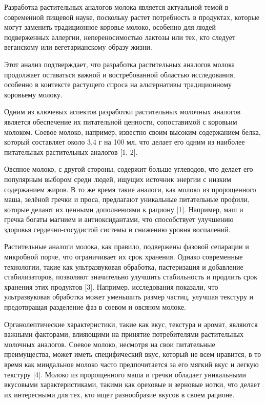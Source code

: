Разработка растительных аналогов молока является актуальной темой в
современной пищевой науке, поскольку растет потребность в продуктах,
которые могут заменить традиционное коровье молоко, особенно для людей
подверженных аллергии, непереносимостью лактозы или тех, кто следует
веганскому или вегетарианскому образу жизни.

Этот анализ подтверждает, что разработка растительных аналогов молока
продолжает оставаться важной и востребованной областью исследования,
особенно в контексте растущего спроса на альтернативы традиционному
коровьему молоку.

Одним из ключевых аспектов разработки растительных молочных аналогов
является обеспечение их питательной ценности, сопоставимой с коровьим
молоком. Соевое молоко, например, известно своим высоким содержанием
белка, который составляет около 3,4 г на 100 мл, что делает его одним из
наиболее питательных растительных аналогов {[}1, 2{]}.

Овсяное молоко, с другой стороны, содержит больше углеводов, что делает
его популярным выбором среди людей, ищущих источник энергии с низким
содержанием жиров. В то же время такие аналоги, как молоко из
пророщенного маша, зелёной гречки и проса, предлагают уникальные
питательные профили, которые делают их ценными дополнениями к рациону
{[}1{]}. Например, маш и гречка богаты магнием и антиоксидантами, что
способствует улучшению здоровья сердечно-сосудистой системы и снижению
уровня воспалений.

Растительные аналоги молока, как правило, подвержены фазовой сепарации и
микробной порче, что ограничивает их срок хранения. Однако современные
технологии, такие как ультразвуковая обработка, пастеризация и
добавление стабилизаторов, позволяют значительно улучшить стабильность и
продлить срок хранения этих продуктов {[}3{]}. Например, исследования
показали, что ультразвуковая обработка может уменьшить размер частиц,
улучшая текстуру и предотвращая разделение фаз в соевом и овсяном
молоке.

Органолептические характеристики, такие как вкус, текстура и аромат,
являются важными факторами, влияющими на принятие потребителями
растительных молочных аналогов. Соевое молоко, несмотря на свои
питательные преимущества, может иметь специфический вкус, который не
всем нравится, в то время как миндальное молоко часто предпочитается за
его мягкий вкус и легкую текстуру {[}4{]}. Молоко из пророщенного маша и
гречки обладает уникальными вкусовыми характеристиками, такими как
ореховые и зерновые нотки, что делает их интересными для тех, кто ищет
разнообразие вкусов в своем рационе.

